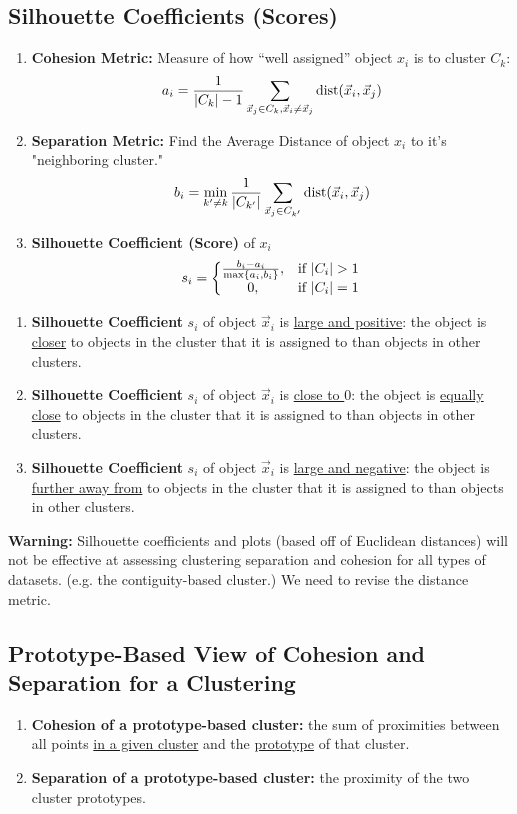 \documentclass[11pt]{elegantbook}
\begin{document}
\subsection{Silhouette Coefficients (Scores)}
\begin{enumerate}
    \item \textbf{Cohesion Metric:} Measure of how “well assigned” object $x_i$ is to cluster $C_k$: $$a_i=\frac{1}{|C_k|-1}\sum_{\vec{x}_j\in C_k,\vec{x}_i\neq \vec{x}_j}\textnormal{dist}(\vec{x}_i,\vec{x}_j)$$
    \item \textbf{Separation Metric:} Find the Average Distance of object $x_i$ to it's "neighboring cluster." $$b_i=\min_{k'\neq k}\frac{1}{|C_{k'}|}\sum_{\vec{x}_j\in C_{k'}}\textnormal{dist}(\vec{x}_i,\vec{x}_j)$$
    \item \textbf{Silhouette Coefficient (Score)} of $x_i$
    $$s_i=\left\{\begin{matrix}
        \frac{b_i-a_i}{\max\{a_i,b_i\}},&\textnormal{if }|C_i|>1\\
        0,&\textnormal{if }|C_i|=1
    \end{matrix}\right.$$
\end{enumerate}

\begin{enumerate}
    \item \textbf{Silhouette Coefficient} $s_i$ of object $\vec{x}_i$ is \underline{large and positive}: the object is \underline{closer} to objects in the cluster that it is assigned to than objects in other clusters.
    \item \textbf{Silhouette Coefficient} $s_i$ of object $\vec{x}_i$ is \underline{close to $0$}: the object is \underline{equally close} to objects in the cluster that it is assigned to than objects in other clusters.
    \item \textbf{Silhouette Coefficient} $s_i$ of object $\vec{x}_i$ is \underline{large and negative}: the object is \underline{further away from} to objects in the cluster that it is assigned to than objects in other clusters.
\end{enumerate}
\textbf{Warning:} Silhouette coefficients and plots (based off of Euclidean distances) will not be effective at assessing clustering separation and cohesion for all types of datasets. (e.g. the contiguity-based cluster.) We need to revise the distance metric.

\subsection{Prototype-Based View of Cohesion and Separation for a Clustering}
\begin{enumerate}
    \item \textbf{Cohesion of a prototype-based cluster:} the sum of proximities between all points \underline{in a given cluster} and the \underline{prototype} of that cluster.
    \item \textbf{Separation of a prototype-based cluster:} the proximity of the two cluster prototypes.
\end{enumerate}
\end{document}
